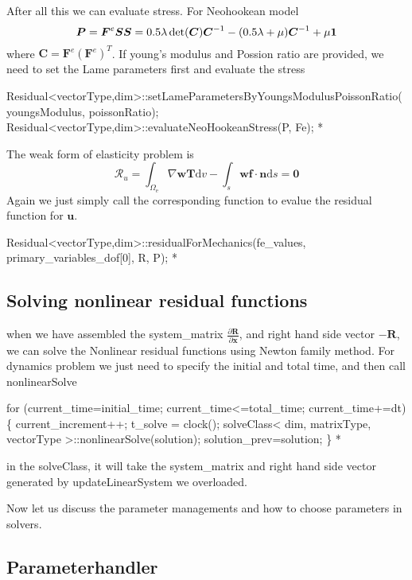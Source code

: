 After all this we can evaluate stress. For Neohookean model \[ \boldsymbol{P}=\boldsymbol{F}^e\boldsymbol{S}\\ \boldsymbol{S}=0.5\lambda\det(\boldsymbol{C})\boldsymbol{C}^{-1}-(0.5\lambda+\mu)\boldsymbol{C}^{-1}+\mu\boldsymbol{1} \] where $\boldsymbol{C}=\boldsymbol{F}^e(\boldsymbol{F}^e)^{T}$. If young's modulus and Possion ratio are provided, we need to set the Lame parameters first and evaluate the stress 
\begin{DoxyCode}
Residual<vectorType,dim>::setLameParametersByYoungsModulusPoissonRatio(youngsModulus, poissonRatio);
Residual<vectorType,dim>::evaluateNeoHookeanStress(P, Fe);
*
\end{DoxyCode}
 The weak form of elasticity problem is \[ \mathscr{R}_u=\int_{\Omega_{\text{e}}}\nabla \boldsymbol{w}\boldsymbol{T} \text{d}v- \int_{s}\boldsymbol{w} \boldsymbol{f} \cdot \boldsymbol{n} \text{d}s = \boldsymbol{0} \] Again we just simply call the corresponding function to evalue the residual function for $\boldsymbol{u}$. 
\begin{DoxyCode}
Residual<vectorType,dim>::residualForMechanics(fe\_values, primary\_variables\_dof[0], R, P);
*
\end{DoxyCode}
\hypertarget{_intercalation_solve}{}\subsection{Solving nonlinear residual functions}\label{_intercalation_solve}
when we have assembled the system\-\_\-matrix $\frac{\partial \boldsymbol{R}}{\partial \boldsymbol{x}} $, and right hand side vector $-\boldsymbol{R}$, we can solve the Nonlinear residual functions using Newton family method. For dynamics problem we just need to specify the initial and total time, and then call {\ttfamily nonlinear\-Solve} 
\begin{DoxyCode}
  \textcolor{keywordflow}{for} (current\_time=initial\_time; current\_time<=total\_time; current\_time+=dt)\{
    current\_increment++;
    t\_solve = clock();
        solveClass< dim, matrixType, vectorType >::nonlinearSolve(solution);
        solution\_prev=solution;
 \}
*
\end{DoxyCode}
 in the {\ttfamily solve\-Class}, it will take the system\-\_\-matrix and right hand side vector generated by {\ttfamily update\-Linear\-System} we overloaded.\par
 \par
 Now let us discuss the parameter managements and how to choose parameters in solvers. \hypertarget{_intercalation_parameter}{}\subsection{Parameterhandler}\label{_intercalation_parameter}
